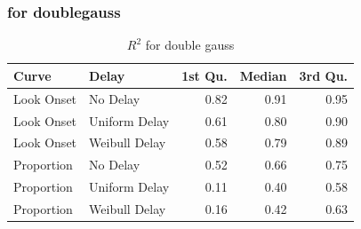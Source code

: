 \documentclass{article}
\begin{document}
\subsubsection{for doublegauss}

\begin{table}[H]
\centering
\begin{tabular}{llrrr}
  \hline
Curve & Delay & 1st Qu. & Median & 3rd Qu. \\ 
  \hline
Look Onset & No Delay & 0.82 & 0.91 & 0.95 \\ 
  Look Onset & Uniform Delay & 0.61 & 0.80 & 0.90 \\ 
  Look Onset & Weibull Delay & 0.58 & 0.79 & 0.89 \\ 
  Proportion & No Delay & 0.52 & 0.66 & 0.75 \\ 
  Proportion & Uniform Delay & 0.11 & 0.40 & 0.58 \\ 
  Proportion & Weibull Delay & 0.16 & 0.42 & 0.63 \\ 
   \hline
\end{tabular}
\caption{$R^2$ for double gauss}
\end{table}
\end{document}
